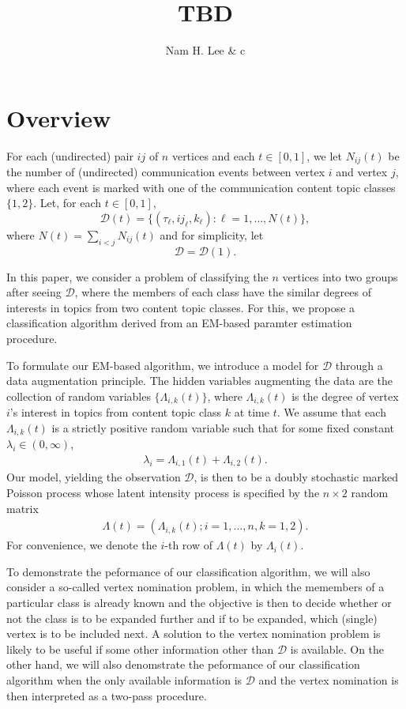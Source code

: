 \documentclass[12pt]{article}%
\title{TBD}
\author{Nam H. Lee \& c}
\begin{document}
\maketitle

\section{Overview}
For each (undirected) pair $ij$ of $n$ vertices and each $t \in [0,1]$,
we let $N_{ij}(t)$ be the number of (undirected) communication events between vertex $i$ and vertex $j$, where each event is marked with one of the communication content topic classes $\{1,2\}$. 
Let, for each $t \in [0,1]$,
$$
\mathcal D(t) = \{ (\tau_\ell, ij_{\ell}, k_{\ell}) : \ell=1,\ldots, N(t) \},
$$ 
where $N(t) = \sum_{i<j} N_{ij}(t)$ and for simplicity, let 
$$
\mathcal D = \mathcal D(1).
$$ 

In this paper, we consider a problem of classifying the $n$ vertices into two groups after seeing $\mathcal D$, where the members of each class have the similar degrees of interests in topics from two content topic classes.  For this, we propose a classification algorithm derived from an EM-based paramter estimation procedure. 

To formulate our EM-based algorithm, we introduce a model for $\mathcal D$ through a data augmentation principle.  The hidden variables augmenting the data are the collection of random variables $\{\Lambda_{i,k}(t)\}$, where $\Lambda_{i,k}(t)$ is the degree of vertex $i$'s interest in topics from content topic class $k$ at time $t$. We assume that each $\Lambda_{i,k}(t)$ is a strictly positive random variable such that for some fixed constant $\lambda_i \in (0,\infty)$,
\begin{eqnarray}
\lambda_i = \Lambda_{i,1}(t) + \Lambda_{i,2}(t).
\end{eqnarray}
Our model, yielding the observation $\mathcal D$, is then to be a doubly stochastic marked Poisson process whose latent intensity process is specified by the $n\times 2$ random matrix
\begin{eqnarray}
\Lambda(t) = (\Lambda_{i,k}(t); i=1,\ldots,n, k=1,2).
\end{eqnarray}
For convenience, we denote the $i$-th row of $\Lambda(t)$ by $\Lambda_i(t)$. 

To demonstrate the peformance of our classification algorithm, we will also consider a so-called vertex nomination problem, in which the memembers of a particular class is already known and the objective is then to decide whether or not the class is to be expanded further and if to be expanded, which (single) vertex is to be included next. A solution to the vertex nomination problem is likely to be useful if some other information other than $\mathcal D$ is available.  On the other hand, we will also denomstrate the peformance of our classification algorithm when the only available information is $\mathcal D$ and the vertex nomination is then interpreted as a two-pass procedure.  
\end{document}
